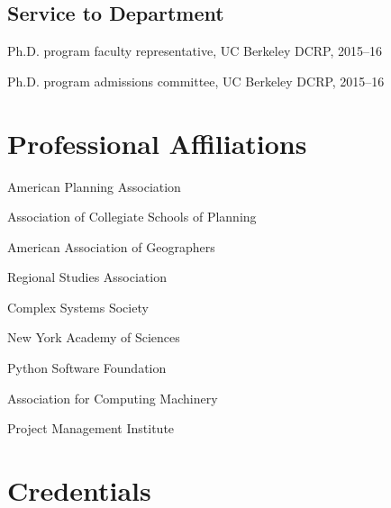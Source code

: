 \documentclass[12pt,letterpaper]{report}
\newcommand{\listitemspace}{0.15em}
\renewenvironment{itemize}
{\begin{list}{}{\setlength{\leftmargin}{0em}
			\setlength{\parskip}{0em}
			\setlength{\itemsep}{\listitemspace}
			\setlength{\parsep}{\listitemspace}}}
	{\end{list}}
\begin{document}
	\subsection*{Service to Department}
	
	\begin{itemize}
		
		\item Ph.D. program faculty representative, UC Berkeley DCRP, 2015--16
		
		\item Ph.D. program admissions committee, UC Berkeley DCRP, 2015--16
		
	\end{itemize}
	
	
	
	\section*{Professional Affiliations}
	
	\begin{itemize}
		
		\item American Planning Association
		
		\item Association of Collegiate Schools of Planning
		
		\item American Association of Geographers
		
		\item Regional Studies Association
		
		\item Complex Systems Society
		
		\item New York Academy of Sciences
		
		\item Python Software Foundation
		
		\item Association for Computing Machinery
		
		\item Project Management Institute
		
	\end{itemize}
	
	
	
	\section*{Credentials}
	
\end{document}
